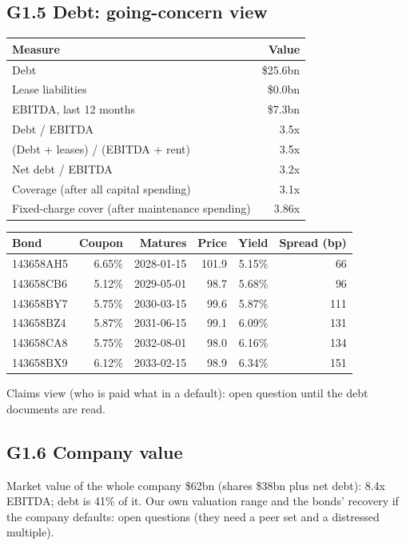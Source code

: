 \documentclass[11pt,a4paper]{article}
\begin{document}
\subsection*{G1.5 Debt: going-concern view}
\begin{center}\footnotesize\setlength{\tabcolsep}{3.5pt}\begin{tabular}{@{}lr@{}}\toprule
Measure & Value \\\midrule
Debt & \$25.6bn \\
Lease liabilities & \$0.0bn \\
EBITDA, last 12 months & \$7.3bn \\
Debt / EBITDA & 3.5x \\
(Debt + leases) / (EBITDA + rent) & 3.5x \\
Net debt / EBITDA & 3.2x \\
Coverage (after all capital spending) & 3.1x \\
Fixed-charge cover (after maintenance spending) & 3.86x \\
\bottomrule\end{tabular}\end{center}
\begin{center}\footnotesize\setlength{\tabcolsep}{3.5pt}\begin{tabular}{@{}lrrrrr@{}}\toprule
Bond & Coupon & Matures & Price & Yield & Spread (bp) \\\midrule
143658AH5 & 6.65\% & 2028-01-15 & 101.9 & 5.15\% & 66 \\
143658CB6 & 5.12\% & 2029-05-01 & 98.7 & 5.68\% & 96 \\
143658BY7 & 5.75\% & 2030-03-15 & 99.6 & 5.87\% & 111 \\
143658BZ4 & 5.87\% & 2031-06-15 & 99.1 & 6.09\% & 131 \\
143658CA8 & 5.75\% & 2032-08-01 & 98.0 & 6.16\% & 134 \\
143658BX9 & 6.12\% & 2033-02-15 & 98.9 & 6.34\% & 151 \\
\bottomrule\end{tabular}\end{center}
Claims view (who is paid what in a default): open question until the debt documents are read.
\subsection*{G1.6 Company value}
Market value of the whole company \$62bn (shares \$38bn plus net debt): 8.4x EBITDA; debt is 41\% of it. Our own valuation range and the bonds' recovery if the company defaults: open questions (they need a peer set and a distressed multiple).
\end{document}
